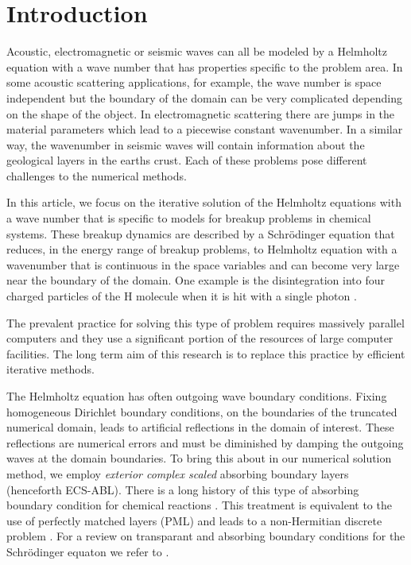\documentclass[mathpazo]{cicp}
\theoremstyle{definition}
\numberwithin{equation}{section}
\providecommand{\hbz}{}
\begin{document}
\section{Introduction}
\label{sec1}
Acoustic, electromagnetic or seismic waves can all be modeled by a
Helmholtz equation with a wave number that has properties specific to
the problem area.  In some acoustic scattering applications, for
example, the wave number is space independent but the boundary of the
domain can be very complicated depending on the shape of the object.
In electromagnetic scattering there are jumps in the material
parameters which lead to a piecewise constant wavenumber.  In a
similar way, the wavenumber in seismic waves will contain information
about the geological layers in the earths crust.  Each of these
problems pose different challenges to the numerical methods.

In this article, we focus on the iterative solution of the Helmholtz
equations with a wave number that is specific to models for breakup
problems in chemical systems. These breakup dynamics are described by
a Schr\"odinger equation that reduces, in the energy range of breakup
problems, to Helmholtz equation with a wavenumber that is continuous
in the space variables and can become very large near the boundary of
the domain. One example is the disintegration into four charged
particles of the H molecule when it is hit with a single photon
\cite{Wim05}.

The \hbz{prevalent practice for solving this type of problem} requires massively parallel
computers \cite{taylor2002computational} and \hbz{they use}
a significant portion of the resources of large computer
facilities.  The long term aim of \hbz{this research} is
to replace this practice by efficient iterative methods.

The Helmholtz equation \hbz{has often} outgoing wave boundary conditions.
Fixing homogeneous Dirichlet boundary conditions, on the boundaries of
the truncated numerical domain, leads to artificial reflections in the
domain of interest. These reflections are numerical errors and must be
diminished by damping the outgoing waves at the domain boundaries. To
bring this about in our numerical solution method, we employ {\it
  exterior complex scaled} \cite{S79} absorbing boundary layers
(henceforth ECS-ABL). There is a long history of this type of
absorbing boundary condition for chemical reactions
\cite{moiseyev1998}. This treatment is equivalent to the use of
perfectly matched layers (PML) \cite{B94,CW94} and leads to a
non-Hermitian discrete problem \cite{reps2009}.  For a review on
transparant and absorbing boundary conditions for the Schr\"odinger
equaton we refer to \cite{antoine2008review}.
  
\end{document}
